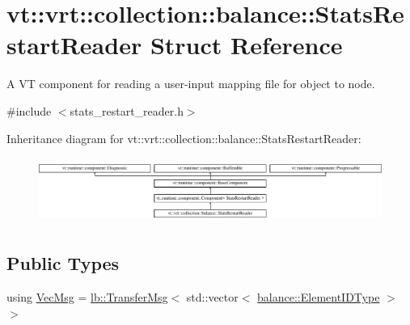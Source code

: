 \hypertarget{structvt_1_1vrt_1_1collection_1_1balance_1_1_stats_restart_reader}{}\section{vt\+:\+:vrt\+:\+:collection\+:\+:balance\+:\+:Stats\+Restart\+Reader Struct Reference}
\label{structvt_1_1vrt_1_1collection_1_1balance_1_1_stats_restart_reader}


A VT component for reading a user-\/input mapping file for object to node.  




{\ttfamily \#include $<$stats\+\_\+restart\+\_\+reader.\+h$>$}

Inheritance diagram for vt\+:\+:vrt\+:\+:collection\+:\+:balance\+:\+:Stats\+Restart\+Reader\+:\begin{figure}[H]
\begin{center}
\leavevmode
\includegraphics[height=2.170543cm]{structvt_1_1vrt_1_1collection_1_1balance_1_1_stats_restart_reader}
\end{center}
\end{figure}
\subsection*{Public Types}
\begin{DoxyCompactItemize}
\item 
using \hyperlink{structvt_1_1vrt_1_1collection_1_1balance_1_1_stats_restart_reader_a7e2a74977e595242bf3abb6c83b7e27b}{Vec\+Msg} = \hyperlink{structvt_1_1vrt_1_1collection_1_1lb_1_1_transfer_msg}{lb\+::\+Transfer\+Msg}$<$ std\+::vector$<$ \hyperlink{namespacevt_1_1vrt_1_1collection_1_1balance_a14c8d2c972f2913aa3f1636e5be0a120}{balance\+::\+Element\+I\+D\+Type} $>$ $>$
\end{DoxyCompactItemize}
